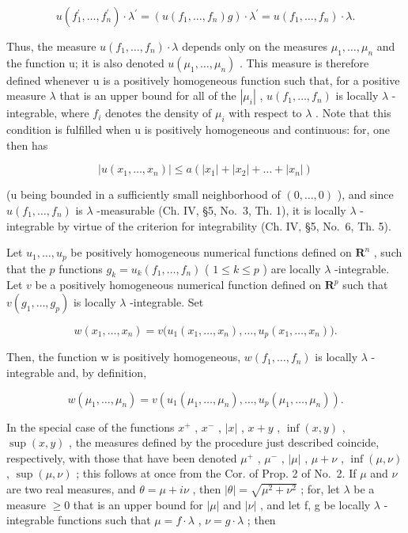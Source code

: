 \[
u \left(f _ {1} ^ {\prime}, \dots , f _ {n} ^ {\prime}\right) \cdot \lambda^ {\prime} = \left(u \left(f _ {1}, \dots , f _ {n}\right) g\right) \cdot \lambda^ {\prime} = u \left(f _ {1}, \dots , f _ {n}\right) \cdot \lambda .
\]

Thus, the measure \(u(f_{1},\ldots,f_{n})\cdot\lambda\) depends only on the measures \(\mu_{1},\ldots,\mu_{n}\) and the function u; it is also denoted \(u(\mu_{1},\ldots,\mu_{n})\) . This measure is therefore defined whenever u is a positively homogeneous function such that, for a positive measure \(\lambda\) that is an upper bound for all of the \(|\mu_{i}|\) , \(u(f_{1},\ldots,f_{n})\) is locally \(\lambda\) -integrable, where \(f_{i}\) denotes the density of \(\mu_{i}\) with respect to \(\lambda\) . Note that this condition is fulfilled when u is positively homogeneous and continuous: for, one then has

\[
\left| u \left(x _ {1}, \dots , x _ {n}\right) \right| \leqslant a \left(\left| x _ {1} \right| + \left| x _ {2} \right| + \dots + \left| x _ {n} \right|\right)
\]

(u being bounded in a sufficiently small neighborhood of \((0,\ldots,0)\) ), and since \(u(f_{1},\ldots,f_{n})\) is \(\lambda\) -measurable (Ch. IV, §5, No.~3, Th. 1), it is locally \(\lambda\) -integrable by virtue of the criterion for integrability (Ch. IV, §5, No.~6, Th. 5).

Let \(u_1, \ldots, u_p\) be positively homogeneous numerical functions defined on \(\mathbf{R}^n\) , such that the \(p\) functions \(g_k = u_k(f_1, \ldots, f_n)\) ( \(1 \leqslant k \leqslant p\) ) are locally \(\lambda\) -integrable. Let \(v\) be a positively homogeneous numerical function defined on \(\mathbf{R}^p\) such that \(v(g_1, \ldots, g_p)\) is locally \(\lambda\) -integrable. Set

\[
w (x _ {1}, \ldots , x _ {n}) = v \big (u _ {1} (x _ {1}, \ldots , x _ {n}), \ldots , u _ {p} (x _ {1}, \ldots , x _ {n}) \big).
\]

Then, the function w is positively homogeneous, \(w(f_{1}, \ldots, f_{n})\) is locally \(\lambda\) -integrable and, by definition,

\[
w \left(\mu_ {1}, \dots , \mu_ {n}\right) = v \left(u _ {1} \left(\mu_ {1}, \dots , \mu_ {n}\right), \dots , u _ {p} \left(\mu_ {1}, \dots , \mu_ {n}\right)\right).
\]

In the special case of the functions \(x^{+}\) , \(x^{-}\) , \(|x|\) , \(x + y\) , \(\inf(x, y)\) , \(\sup(x, y)\) , the measures defined by the procedure just described coincide, respectively, with those that have been denoted \(\mu^{+}\) , \(\mu^{-}\) , \(|\mu|\) , \(\mu + \nu\) , \(\inf(\mu, \nu)\) , \(\sup(\mu, \nu)\) ; this follows at once from the Cor. of Prop. 2 of No.~2. If \(\mu\) and \(\nu\) are two real measures, and \(\theta = \mu + i\nu\) , then \(|\theta| = \sqrt{\mu^{2} + \nu^{2}}\) ; for, let \(\lambda\) be a measure \(\geqslant 0\) that is an upper bound for \(|\mu|\) and \(|\nu|\) , and let f, g be locally \(\lambda\) -integrable functions such that \(\mu = f \cdot \lambda\) , \(\nu = g \cdot \lambda\) ; then


